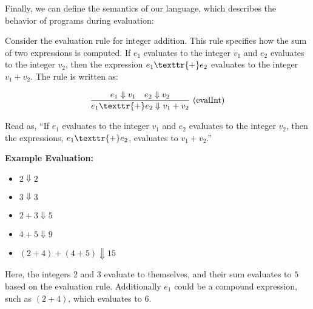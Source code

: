 \newpage 

\noindent
Finally, we can define the semantics of our language, which describes the behavior of programs during evaluation:

\begin{Example}

    \label{ex:eval_integer_addition}
    Consider the evaluation rule for integer addition. This rule specifies how the sum of two expressions is computed. 
    If $e_1$ evaluates to the integer $v_1$ and $e_2$ evaluates to the integer $v_2$, 
    then the expression $e_1 \texttr{ + } e_2$ evaluates to the integer $v_1 + v_2$. The rule is written as: \LARGE

    \[
    \frac{e_1 \Downarrow v_1 \quad e_2 \Downarrow v_2}{e_1 \texttr{ + } e_2 \Downarrow v_1 + v_2} \ (\text{evalInt})
    \]

    \vspace{.5em}
    \normalsize
    \noindent
    Read as, ``If $e_1$ evaluates to the integer $v_1$ and $e_2$ evaluates to the integer $v_2$, 
    then the expressions, $e_1 \texttr{ + } e_2$, evaluates to $v_1 + v_2$.''

    \vspace{1em}
    \textbf{Example Evaluation:}
    \begin{itemize}
        \item $2 \Downarrow 2$
        \item $3 \Downarrow 3$
        \item $2 + 3 \Downarrow 5$
        \item $4 + 5 \Downarrow 9$
        \item $(2 + 4) + (4 + 5) \Downarrow 15$
    \end{itemize}

    \noindent
    Here, the integers $2$ and $3$ evaluate to themselves, and their sum evaluates to $5$ based on the evaluation rule.
    Additionally $e_1$ could be a compound expression, such as $(2 + 4)$, which evaluates to $6$.
\end{Example}


